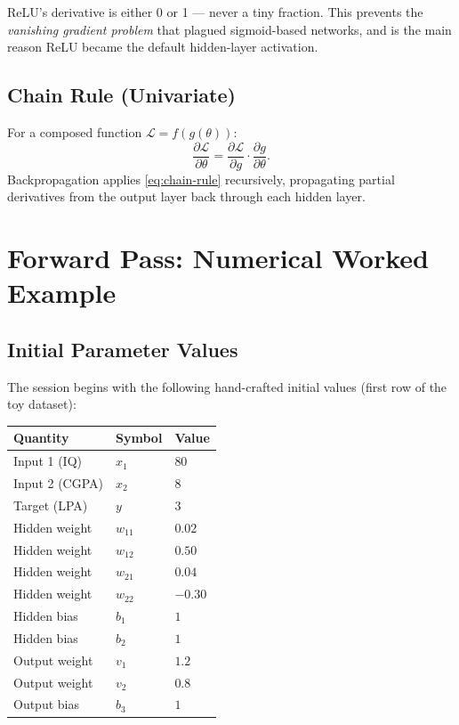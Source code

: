 \documentclass[12pt,a4paper]{article}
\newcommand{\Loss}{\mathcal{L}}
\newcommand{\pderiv}[2]{\dfrac{\partial #1}{\partial #2}}
\begin{document}
\begin{keyinsight}
ReLU's derivative is either 0 or 1 --- never a tiny fraction.
This prevents the \emph{vanishing gradient problem} that plagued
sigmoid-based networks, and is the main reason ReLU became the
default hidden-layer activation.
\end{keyinsight}

\subsection{Chain Rule (Univariate)}

For a composed function $\Loss = f(g(\theta))$:
\begin{equation}
  \pderiv{\Loss}{\theta} = \pderiv{\Loss}{g} \cdot \pderiv{g}{\theta}.
  \label{eq:chain-rule}
\end{equation}
Backpropagation applies \cref{eq:chain-rule} recursively, propagating
partial derivatives from the output layer back through each hidden layer.

\section{Forward Pass: Numerical Worked Example}
\label{sec:forward}

\subsection{Initial Parameter Values}

The session begins with the following hand-crafted initial values
(first row of the toy dataset):

\begin{center}
\begin{tabular}{lll}
\toprule
\textbf{Quantity} & \textbf{Symbol} & \textbf{Value} \\
\midrule
Input 1 (IQ)    & $x_1$ & $80$ \\
Input 2 (CGPA)  & $x_2$ & $8$  \\
Target (LPA)    & $y$   & $3$  \\
\midrule
Hidden weight   & $w_{11}$ & $0.02$ \\
Hidden weight   & $w_{12}$ & $0.50$ \\
Hidden weight   & $w_{21}$ & $0.04$ \\
Hidden weight   & $w_{22}$ & $-0.30$ \\
Hidden bias     & $b_1$    & $1$ \\
Hidden bias     & $b_2$    & $1$ \\
Output weight   & $v_1$    & $1.2$ \\
Output weight   & $v_2$    & $0.8$ \\
Output bias     & $b_3$    & $1$ \\
\bottomrule
\end{tabular}
\end{center}
\end{document}
